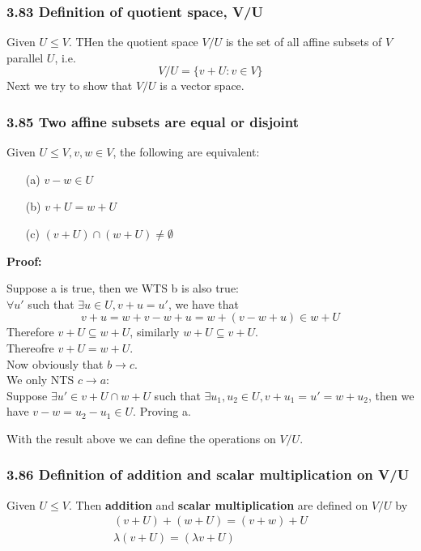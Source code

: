 \documentclass{article}
\begin{document}
\subsubsection*{3.83 Definition of quotient space, V/U}
Given $U \leq V$. THen the quotient space $V/U$ is the set of all affine subsets of $V$ parallel $U$, i.e.
\begin{equation*}
    V/U = \{v+U : v \in V\}
\end{equation*}
Next we try to show that $V/U$ is a vector space.
\subsubsection*{3.85 Two affine subsets are equal or disjoint}
Given $U \leq V, v, w \in V$, the following are equivalent:
\begin{itemize}
    \item[(a)] $v-w \in U$
    \item[(b)] $v+U = w+U$
    \item[(c)] $(v+U) \cap (w+U) \neq \emptyset$
\end{itemize}
\textbf{Proof:}
\begin{addmargin}[1em]{0em}
    Suppose a is true, then we WTS b is also true:\\
    $\forall u'$ such that $\exists u \in U, v+u = u'$, we have that 
    \begin{equation*}
        v + u = w + v - w + u = w + (v-w + u) \in w+U
    \end{equation*}
    Therefore $v+U \subseteq w+U$, similarly $w+U \subseteq v+U$.\\
    Thereofre $v+U = w+U$.\\
    Now obviously that $b \rightarrow c$.\\
    We only NTS $c \rightarrow a$:\\
    Suppose $\exists u' \in v+U \cap w+U$ such that $\exists u_1, u_2 \in U, v+u_1 = u' = w+u_2$, then we have $v-w = u_2 - u_1 \in U$. Proving a.
\end{addmargin}
With the result above we can define the operations on $V/U$.
\subsubsection*{3.86 Definition of addition and scalar multiplication on V/U}
Given $U \leq V$. Then \textbf{addition} and \textbf{scalar multiplication} are defined on $V/U$ by
\begin{equation*}
    \begin{split}
        (v+U) + (w+U) = (v+w)+U\\
        \lambda (v+U) = (\lambda v+U)
    \end{split}
\end{equation*}
\end{document}
